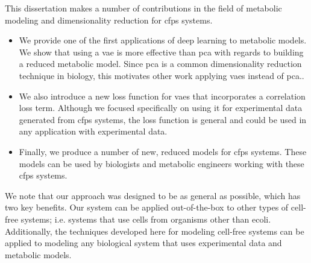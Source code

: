 This dissertation makes a number of contributions in the field of metabolic modeling and dimensionality reduction for \gls{cfps} systems.
\begin{itemize}
\item We provide one of the first applications of deep learning to metabolic models.
We show that using a \gls{vae} is more effective than \gls{pca} with regards to building a reduced metabolic model.
Since \gls{pca} is a common dimensionality reduction technique in biology, this motivates other work applying \glspl{vae} instead of \gls{pca}..
\item We also introduce a new loss function for \glspl{vae} that incorporates a correlation loss term.
Although we focused specifically on using it for experimental data generated from \gls{cfps} systems, the loss function is general and could be used in any application with experimental data.
\item Finally, we produce a number of new, reduced models for \gls{cfps} systems.
These models can be used by biologists and metabolic engineers working with these \gls{cfps} systems.
\end{itemize}
We note that our approach was designed to be as general as possible, which has two key benefits.
Our system can be applied out-of-the-box to other types of cell-free systems; i.e. systems that use cells from organisms other than \gls{ecoli}.
Additionally, the techniques developed here for modeling cell-free systems can be applied to modeling any biological system that uses experimental data and metabolic models.

